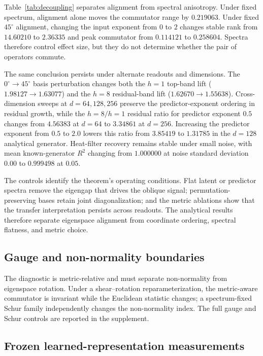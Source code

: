 \documentclass{article}
\begin{document}
Table~\ref{tab:decoupling} separates alignment from spectral anisotropy. Under fixed spectrum, alignment alone moves the commutator range by $0.219063$. Under fixed $45^\circ$ alignment, changing the input exponent from $0$ to $2$ changes stable rank from $14.60210$ to $2.36335$ and peak commutator from $0.114121$ to $0.258604$. Spectra therefore control effect size, but they do not determine whether the pair of operators commute.

The same conclusion persists under alternate readouts and dimensions. The $0^\circ\to45^\circ$ basis perturbation changes both the $h=1$ top-band lift ($1.98127\to1.63077$) and the $h=8$ residual-band lift ($1.62670\to1.55638$). Cross-dimension sweeps at $d=64,128,256$ preserve the predictor-exponent ordering in residual growth, while the $h=8/h=1$ residual ratio for predictor exponent $0.5$ changes from $4.56383$ at $d=64$ to $3.34861$ at $d=256$. Increasing the predictor exponent from $0.5$ to $2.0$ lowers this ratio from $3.85419$ to $1.31785$ in the $d=128$ analytical generator. Heat-filter recovery remains stable under small noise, with mean known-generator $R^2$ changing from $1.000000$ at noise standard deviation $0.00$ to $0.999498$ at $0.05$.

The controls identify the theorem's operating conditions. Flat latent or
predictor spectra remove the eigengap that drives the oblique signal;
permutation-preserving bases retain joint diagonalization; and the metric
ablations show that the transfer interpretation persists across readouts. The
analytical results therefore separate eigenspace alignment from coordinate
ordering, spectral flatness, and metric choice.

\subsection{Gauge and non-normality boundaries}
\label{sec:gauge-nonnormality}

The diagnostic is metric-relative and must separate non-normality from
eigenspace rotation. Under a shear--rotation reparameterization, the
metric-aware commutator is invariant while the Euclidean statistic changes;
a spectrum-fixed Schur family independently changes the non-normality index.
The full gauge and Schur controls are reported in the supplement.

\subsection{Frozen learned-representation measurements}
\label{sec:frozen-learned-measurements}
\end{document}
